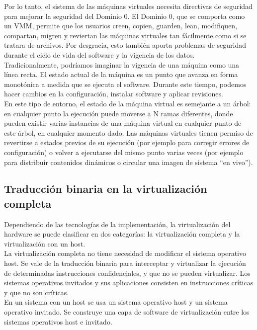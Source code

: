Por lo tanto, el sistema de las máquinas virtuales necesita directivas de seguridad para mejorar la seguridad del Dominio 0. El Dominio 0, que se comporta como un VMM, permite que los usuarios creen, copien, guarden, lean, modifiquen, compartan, migren y reviertan las máquinas virtuales tan fácilmente como si se tratara de archivos. Por desgracia, esto también aporta problemas de seguridad durante el ciclo de vida del software y la vigencia de los datos.\\

Tradicionalmente, podríamos imaginar la vigencia de una máquina como una línea recta. El estado actual de la máquina es un punto que avanza en forma monotónica a medida que se ejecuta el software. Durante este tiempo, podemos hacer cambios en la configuración, instalar software y aplicar revisiones.\\

En este tipo de entorno, el estado de la máquina virtual es semejante a un árbol: en cualquier punto la ejecución puede moverse a N ramas diferentes, donde pueden existir varias instancias de una máquina virtual en cualquier punto de este árbol, en cualquier momento dado. Las máquinas virtuales tienen permiso de revertirse a estados previos de su ejecución (por ejemplo para corregir errores de configuración) o volver a ejecutarse del mismo punto varias veces (por ejemplo para distribuir contenidos dinámicos o circular una imagen de sistema “en vivo”).

\subsection{Traducción binaria en la virtualización completa}
Dependiendo de las tecnologías de la implementación, la virtualización del hardware se puede clasificar en dos categorías: la virtualización completa y la virtualización con un host.\\

La virtualización completa no tiene necesidad de modificar el sistema operativo host. Se vale de la traducción binaria para interceptar y virtualizar la ejecución de determinadas instrucciones confidenciales, y que no se pueden virtualizar. Los sistemas operativos invitados y sus aplicaciones consisten en instrucciones críticas y que no son críticas.\\

En un sistema con un host se usa un sistema operativo host y un sistema operativo invitado. Se construye una capa de software de virtualización entre los sistemas operativos host e invitado.\\

